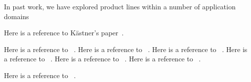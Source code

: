 In past work, we have explored product lines within a number of application domains~\cite{Heineman:2015:TMO:2791060.2791076,PEPM18}

%
%
%
%
%






Here is a reference to K\"{a}stner's paper~\cite{Kastner:2012}.

Here is a reference to ~\cite{leich2005tool}.
Here is a reference to ~\cite{proksch2014tool}.
Here is a reference to ~\cite{7203038}.
Here is a reference to ~\cite{Sayre:2005:UMA:1082983.1083277}.
Here is a reference to ~\cite{Setyautami:2016:UPD:2934466.2934479}.
Here is a reference to ~\cite{Sousa:2016:EFM:2934466.2934475}.

Here is a reference to ~\cite{Arcaini:2017:ARV:3106195.3106206}.

